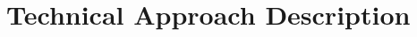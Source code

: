 \documentclass{article}
\begin{document}
\section{Technical Approach Description}











\end{document}
